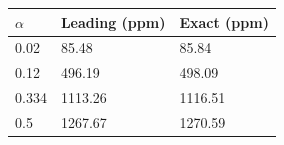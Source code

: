 \begin{tabular}{lll}
\toprule
$\alpha$ & Leading (ppm) & Exact (ppm) \\
\midrule
0.02 & 85.48 & 85.84 \\
0.12 & 496.19 & 498.09 \\
0.334 & 1113.26 & 1116.51 \\
0.5 & 1267.67 & 1270.59 \\
\bottomrule
\end{tabular}
